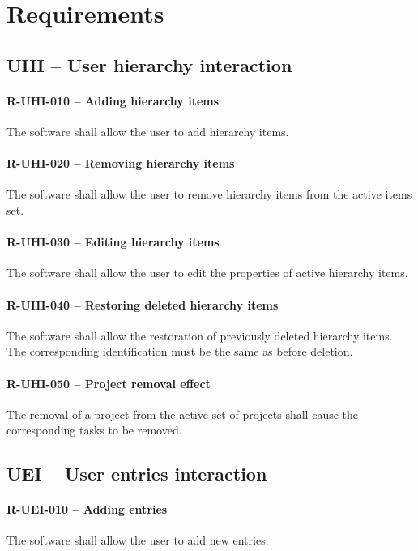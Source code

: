 \section{Requirements}
\subsection{UHI -- User hierarchy interaction}
\paragraph{R-UHI-010 -- Adding hierarchy items}
The software shall allow the user to add hierarchy items.

\paragraph{R-UHI-020 -- Removing hierarchy items}
The software shall allow the user to remove hierarchy items
from the active items set.

\paragraph{R-UHI-030 -- Editing hierarchy items}
The software shall allow the user to edit the properties of
active hierarchy items.

\paragraph{R-UHI-040 -- Restoring deleted hierarchy items}
The software shall allow the restoration of previously deleted
hierarchy items. The corresponding identification must be the same as before
deletion.

\paragraph{R-UHI-050 -- Project removal effect}
The removal of a project from the active set of projects shall cause
the corresponding tasks to be removed.

\subsection{UEI -- User entries interaction}
\paragraph{R-UEI-010 -- Adding entries}
The software shall allow the user to add new entries.

